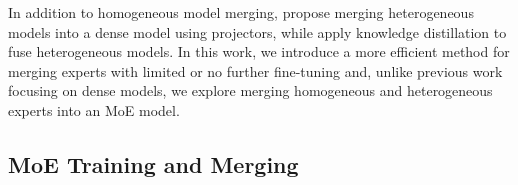 
In addition to homogeneous model merging, \citet{roberts2024pretrained} propose merging heterogeneous models into a dense model using projectors, while \citet{wan2024knowledge} apply knowledge distillation to fuse heterogeneous models. 
In this work, we introduce a more efficient method for merging experts with limited or no further fine-tuning and, unlike previous work focusing on dense models, we explore merging homogeneous and heterogeneous experts into an MoE model. 

\subsection{MoE Training and Merging}


